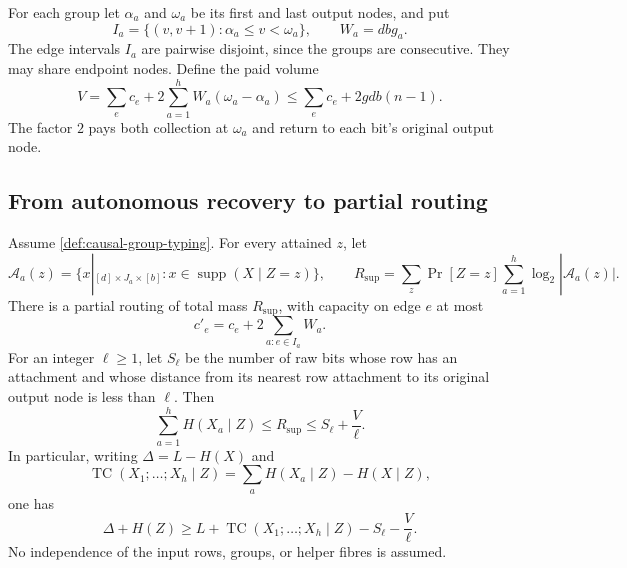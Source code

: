 For each group let $\alpha_a$ and $\omega_a$ be its first and last
output nodes, and put
\[
 I_a=\{(v,v+1):\alpha_a\le v<\omega_a\},\qquad
 W_a=db g_a.
\]
The edge intervals $I_a$ are pairwise disjoint, since the groups are
consecutive.  They may share endpoint nodes.  Define the paid volume
\begin{equation}\label{eq:group-volume}
 V=\sum_e c_e+2\sum_{a=1}^{h}W_a(\omega_a-\alpha_a)
 \le \sum_e c_e+2gdb(n-1).
\end{equation}
The factor $2$ pays both collection at $\omega_a$ and return to each
bit's original output node.

\subsection{From autonomous recovery to partial routing}

\begin{theorem}
\label{thm:causal-group-routing}
Assume \cref{def:causal-group-typing}.  For every attained $z$, let
\[
 \mathcal A_a(z)=
 \{x|_{[d]\times J_a\times[b]}:x\in\operatorname{supp}(X\mid Z=z)\},
 \qquad
 R_{\mathrm{sup}}=
 \sum_z\Pr[Z=z]\sum_{a=1}^{h}\log_2|\mathcal A_a(z)|.
\]
There is a partial routing of total mass $R_{\mathrm{sup}}$, with
capacity on edge $e$ at most
\begin{equation}\label{eq:group-augmented-capacity}
 c'_e=c_e+2\sum_{a:e\in I_a}W_a.
\end{equation}
For an integer $\ell\ge1$, let $S_\ell$ be the number of raw bits
whose row has an attachment and whose distance from its nearest row
attachment to its original output node is less than $\ell$.  Then
\begin{equation}\label{eq:causal-group-finite}
 \sum_{a=1}^{h}H(X_a\mid Z)
 \le R_{\mathrm{sup}}
 \le S_\ell+\frac{V}{\ell}.
\end{equation}
In particular, writing $\Delta=L-H(X)$ and
\[
 \operatorname{TC}(X_1;\ldots;X_h\mid Z)
   =\sum_a H(X_a\mid Z)-H(X\mid Z),
\]
one has
\begin{equation}\label{eq:causal-group-helper}
 \Delta+H(Z)\ge
 L+\operatorname{TC}(X_1;\ldots;X_h\mid Z)
   -S_\ell-\frac{V}{\ell}.
\end{equation}
No independence of the input rows, groups, or helper fibres is assumed.
\end{theorem}

